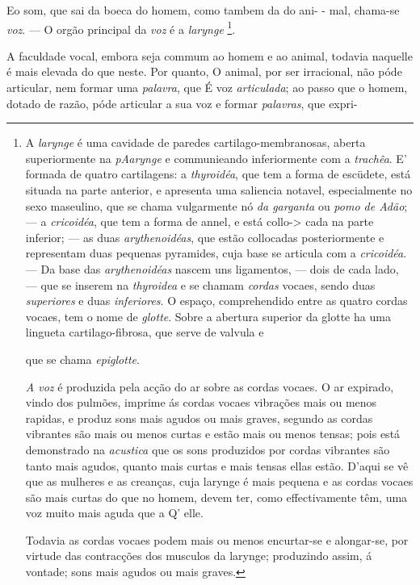 Eo som, que sai da boeca do homem, como tambem da do ani- - mal, chama-se \emph{voz}. --- O orgão principal da \emph{voz} é a \emph{larynge} \footnote{A \emph{larynge} é uma cavidade de paredes cartilago-membranosas, aberta superiormente na \emph{pAarynge} e communieando inferiormente com a \emph{trachêa}. E' formada de quatro cartilagens: a \emph{thyroidéa}, que tem a forma de escüdete, está situada na parte anterior, e apresenta uma saliencia notavel, especialmente no sexo maseulino, que se chama vulgarmente nó \emph{da garganta} ou \emph{pomo de Adão}; --- a \emph{cricoidéa}, que tem a forma de annel, e está collo-\textgreater{} cada na parte inferior; --- as duas \emph{arythenoidéas}, que estão collocadas posteriormente e representam duas pequenas pyramides, cuja base se articula com a \emph{cricoidéa}. --- Da base das \emph{arythenoidéas} nascem uns ligamentos, --- dois de cada lado, --- que se inserem na \emph{thyroidea} e se chamam \emph{cordas} vocaes, sendo duas \emph{superiores} e duas \emph{inferiores}. O espaço, comprehendido entre as quatro cordas vocaes, tem o nome de \emph{glotte}. Sobre a abertura superior da glotte ha uma lingueta cartilago-fibrosa, que serve de valvula e\par que se chama \emph{epiglotte}.\par \emph{A voz} é produzida pela acção do ar sobre as cordas vocaes. O ar expirado, vindo dos pulmões, imprime ás cordas vocaes vibrações mais ou menos rapidas, e produz sons mais agudos ou mais graves, segundo as cordas vibrantes são mais ou menos curtas e estão mais ou menos tensas; pois está demonstrado na \emph{acustica} que os sons produzidos por cordas vibrantes são tanto mais agudos, quanto mais curtas e mais tensas ellas estão. D'aqui se vê que as mulheres e as creanças, cuja larynge é mais pequena e as cordas vocaes são mais curtas do que no homem, devem ter, como effectivamente têm, uma voz muito mais aguda que a Q' elle.\par Todavia as cordas vocaes podem mais ou menos encurtar-se e alongar-se, por virtude das contracções dos musculos da larynge; produzindo assim, á vontade; sons mais agudos ou mais graves.}.


A faculdade vocal, embora seja commum ao homem e ao animal, todavia     naquelle é mais elevada do que neste. Por quanto, O animal, por ser irracional, não póde articular, nem formar uma \emph{palavra}, que É voz \emph{articulada}; ao passo que o homem, dotado de razão, póde articular a sua voz e formar \emph{palavras}, que expri-

